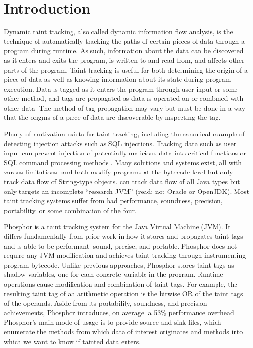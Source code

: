 \chapter{Introduction}

Dynamic taint tracking, also called dynamic information flow analysis, is the technique of automatically tracking the paths of certain pieces of data through a program during runtime. As such, information about the data can be discovered as it enters and exits the program, is written to and read from, and affects other parts of the program. Taint tracking is useful for both determining the origin of a piece of data as well as knowing information about its state during program execution. Data is tagged as it enters the program through user input or some other method, and tags are propagated as data is operated on or combined with other data. The method of tag propagation may vary but must be done in a way that the origins of a piece of data are discoverable by inspecting the tag.

Plenty of motivation exists for taint tracking, including the canonical example of detecting injection attacks such as SQL injections. Tracking data such as user input can prevent injection of potentially malicious data into critical functions or SQL command processing methods \cite{sql1} \cite{sql2}. Many solutions and systems exist, all with varous limitations. \cite{stringtaint} and \cite{sql1} both modify programs at the bytecode level but only track data flow of String-type objects. \cite{jikes} can track data flow of all Java types but only targets an incomplete ``research JVM'' (read: not Oracle or OpenJDK).  Most taint tracking systems suffer from bad performance, soundness, precision, portability, or some combination of the four. 

Phosphor \cite{phosphor_oopsla} is a taint tracking system for the Java Virtual Machine (JVM). It differs fundamentally from prior work in how it stores and propagates taint tags and is able to be performant, sound, precise, and portable. Phosphor does not require any JVM modification and achieves taint tracking through instrumenting program bytecode. Unlike previous approaches, Phosphor stores taint tags as shadow variables, one for each concrete variable in the program. Runtime operations cause modification and combination of taint tags. For example, the resulting taint tag of an arithmetic operation is the bitwise OR of the taint tags of the operands. Aside from its portability, soundness, and precision achievements, Phosphor introduces, on average, a 53\% performance overhead. Phosphor's main mode of usage is to provide source and sink files, which enumerate the methods from which data of interest originates and methods into which we want to know if tainted data enters. 

